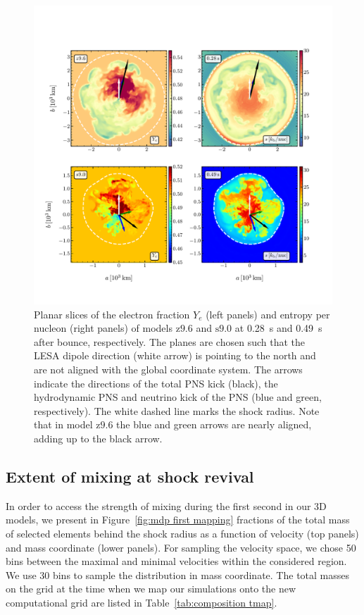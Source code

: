\documentclass[fleqn,usenatbib]{mnras}
\newcommand{\snine}{\ensuremath{\mathrm{s9.0}}\xspace}
\newcommand{\znine}{\ensuremath{\mathrm{z9.6}}\xspace}
\begin{document}
\begin{figure}
 \centering
 \includegraphics[width=\textwidth,trim=0cm 1.3cm 0cm 2cm,clip]
 {pic/z9_s9_3d_ye_sto_kick_slices_paper.pdf}
 \caption{Planar slices of the electron fraction $Y_{e}$ (left panels) 
 and entropy per nucleon (right panels) of models \znine and \snine at 0.28~s and 0.49~s after bounce, 
 respectively. The planes are chosen such that the LESA dipole direction (white arrow) 
 is pointing to the north and are not aligned with the global coordinate system. 
 The arrows indicate the directions of the total PNS kick (black), the hydrodynamic PNS and 
 neutrino kick of the PNS (blue and green, respectively). The white dashed line marks the shock radius. Note that
 in model \znine the blue and green arrows are nearly aligned, adding up to the black arrow.}
 \label{fig:sto ye s9 z9 kick}
\end{figure}

\subsection{Extent of mixing at shock revival}
\label{sec:Extent of mixing at shock revival}

In order to access the strength of mixing during the first second in our 3D models, we present in Figure~\ref{fig:mdp first mapping} fractions of the total mass of selected elements behind the shock radius 
as a function of velocity (top panels) and mass coordinate (lower panels). 
For sampling the velocity space, we chose 50 bins between the maximal and minimal velocities within the considered region. We use 30 bins to sample the distribution in mass coordinate. The total masses 
on the grid at the time when we map our simulations onto the new computational grid
are listed in Table~\ref{tab:composition tmap}.
\end{document}

